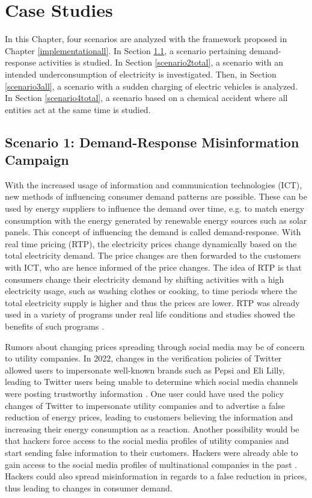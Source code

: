 \chapter{Case Studies}
\label{results}

In this Chapter, four scenarios are analyzed with the framework 
proposed in Chapter \ref{implementationall}.
In Section \ref{demandresponsesection}, a scenario
pertaining demand-response activities is studied.
In Section \ref{scenario2total}, a scenario
with an intended underconsumption of electricity is 
investigated. Then, in Section \ref{scenario3all},
a scenario with a sudden charging of electric vehicles
is analyzed.
In Section \ref{scenario4total}, a scenario 
based on a chemical accident where all entities act at 
the same time is studied.


\section{Scenario 1: Demand-Response Misinformation Campaign}
\label{demandresponsesection}

With the increased usage of information and communication 
technologies (ICT), new methods of influencing
consumer demand patterns are possible. 
These can be used by energy suppliers to influence the 
demand over time, e.g. to match energy consumption
with the energy generated by renewable energy sources such 
as solar panels. 
This concept of influencing the demand is called demand-response. 
With real time pricing (RTP), the electricity prices change
dynamically based on the total electricity demand.
The price changes are then forwarded to the customers with ICT, 
who are hence informed of the price changes.
The idea of RTP is that consumers change their electricity demand
by shifting activities with a high electricity usage, 
such as washing clothes or cooking, to time periods 
where the total electricity supply is higher and thus the prices
are lower.
RTP was already used in a variety of programs
under real life conditions \cite{barbose2004survey} 
and studies showed the benefits of such programs \cite{albadi2008summary}.

Rumors about changing prices spreading through social media may be of 
concern to utility companies.
In 2022, changes in the verification policies of Twitter allowed users 
to impersonate well-known brands such as Pepsi and Eli Lilly, leading to Twitter 
users being unable to determine which social media channels were
posting trustworthy information \cite{twitterchaos}. One user could
have used the policy changes of Twitter to impersonate	utility companies
and to advertise a false reduction of energy prices, leading to customers
believing the information and increasing their energy consumption as a 
reaction. Another possibility would be that hackers force access to the
social media profiles of utility companies and start sending false 
information to their customers. Hackers were already able to gain access
to the social media profiles of multinational companies in the past
\cite{twitterhacker}. Hackers could also spread misinformation in regards
to a false reduction in prices, thus leading to changes in consumer demand.


